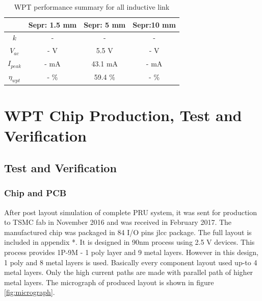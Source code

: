 \documentclass[UKenglish]{ifimaster}  %
\begin{document}
\begin{table}[H]
\caption{WPT performance summary for all inductive link} 
\begin{center}
\begin{tabular}{c|c|c|c}
\hline \hline
					& \textbf{Sepr: 1.5 mm}	& \textbf{Sepr: 5 mm} 	& \textbf{Sepr:10 mm} \\ \hline \hline
$ k $				& -						& -						& -		\\ \hline
$V_{ac}$			& - \si{\volt}			& 5.5 \si{\volt} 		& -	\si{\volt}	\\ \hline
$I_{peak}$			& - \si{\milli\ampere}	& 43.1 \si{\milli\ampere} 	& - \si{\milli\ampere} \\ \hline
$\eta_{wpt}$		& -	\%					& 59.4 \%					& - \% \\ 
 
\hline \hline
\end{tabular}
\end{center}
\label{tab:wpt_spec_all}
\end{table}%



\part{WPT Chip Production, Test and Verification } 
\chapter{Test and Verification }  %

\section{Chip and PCB}
After post layout simulation of complete PRU system, it was sent for production to TSMC fab in November 2016 and was received in February 2017. The  manufactured chip was packaged in 84 I/O pins \acrshort{jlcc} package. The full layout is included in appendix *. It is designed in 90nm process using 2.5 V devices. This process provides 1P-9M - 1 poly layer and 9 metal layers. However in this design, 1 poly and 8 metal layers is used. Basically every component layout used up-to 4 metal layers. Only the high current paths are made with parallel path of higher metal layers. The micrograph of produced layout is shown in figure \ref{fig:micrograph}.\\
\end{document}
